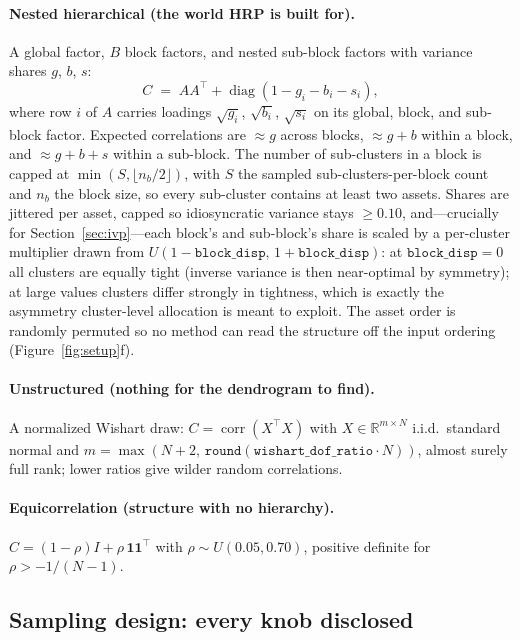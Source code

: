 \documentclass[11pt]{article}
\begin{document}
\paragraph{Nested hierarchical (the world HRP is built for).}
A global factor, $B$ block factors, and nested sub-block factors with
variance shares $g$, $b$, $s$:
\begin{equation}
C \;=\; AA^{\top} + \operatorname{diag}(1-g_i-b_i-s_i),
\end{equation}
where row $i$ of $A$ carries loadings $\sqrt{g_i}$, $\sqrt{b_i}$,
$\sqrt{s_i}$ on its global, block, and sub-block factor. Expected
correlations are ${\approx}g$ across blocks, ${\approx}g+b$ within a block,
and ${\approx}g+b+s$ within a sub-block. The number of sub-clusters in a
block is capped at $\min(S,\lfloor n_b/2\rfloor)$, with $S$ the sampled
sub-clusters-per-block count and $n_b$ the block size, so every sub-cluster
contains at least two assets. Shares are jittered per asset,
capped so idiosyncratic variance stays $\ge0.10$, and---crucially for
Section~\ref{sec:ivp}---each block's and sub-block's share is scaled by a
per-cluster multiplier drawn from
$U(1-\texttt{block\_disp},\,1+\texttt{block\_disp})$: at
$\texttt{block\_disp}=0$ all clusters are equally tight (inverse variance is
then near-optimal by symmetry); at large values clusters differ strongly in
tightness, which is exactly the asymmetry cluster-level allocation is meant
to exploit. The asset order is randomly permuted so no method can read the
structure off the input ordering (Figure~\ref{fig:setup}f).

\paragraph{Unstructured (nothing for the dendrogram to find).}
A normalized Wishart draw: $C=\operatorname{corr}(X^{\top}X)$ with
$X\in\mathbb{R}^{m\times N}$ i.i.d.\ standard normal and
$m=\max(N+2,\,\texttt{round}(\texttt{wishart\_dof\_ratio}\cdot N))$, almost
surely full rank; lower ratios give wilder random correlations.

\paragraph{Equicorrelation (structure with no hierarchy).}
$C=(1-\rho)I+\rho\,\mathbf{1}\mathbf{1}^{\top}$ with
$\rho\sim U(0.05,0.70)$, positive definite for $\rho>-1/(N-1)$.

\subsection{Sampling design: every knob disclosed}
\label{sec:ranges}
\end{document}
